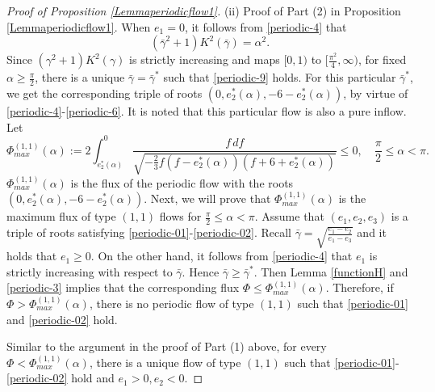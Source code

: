 \documentclass[reqno,12pt]{amsart}
\begin{document}
\begin{proof}[Proof of Proposition \ref{Lemmaperiodicflow1}]
     (ii) Proof of Part (2) in Proposition \ref{Lemmaperiodicflow1}.
    When $e_1 = 0$, it follows from \eqref{periodic-4} that 
\begin{equation}\label{periodic-9}
( \bar{\gamma}^2 + 1) K^2( \bar{\gamma}) = \alpha^2. 
\end{equation}
Since $( {\gamma}^2 +1)K^2( {\gamma})$ is strictly increasing and maps $[0, 1)$ to $[\frac{\pi^2}{4}, \infty)$, for fixed $\alpha\geq \frac{\pi}{2}$, there is a unique $ \bar{\gamma}=  \bar{\gamma}^*$ such that \eqref{periodic-9} holds. For this particular $ \bar{\gamma}^*$, we get the corresponding triple of roots $(0, e_2^*(\alpha), -6-e_2^*(\alpha))$, by virtue of \eqref{periodic-4}-\eqref{periodic-6}. It is noted that this particular flow is also a pure inflow. 
Let 
\begin{equation}\label{periodic-10}
    \Phi_{max}^{(1, 1)} (\alpha) := 2\int_{e_2^*(\alpha)}^0 \frac{f\, df}{\sqrt{-\frac23 f (f - e_2^*(\alpha))(f+ 6 + e_2^*(\alpha))}} \leq 0, 
    \quad
    \frac{\pi}{2}\leq \alpha<\pi. 
\end{equation}
$\Phi_{max}^{(1, 1)} (\alpha)$ is the flux of the periodic flow with the roots $(0, e_2^*(\alpha), -6- e^*_2(\alpha))$. Next, we will prove that $\Phi_{max}^{(1, 1)}(\alpha)$ is the maximum flux of type $(1, 1)$ flows for $\frac{\pi}{2}\leq \alpha<\pi$. 
Assume that $(e_1, e_2, e_3)$ is a triple of roots satisfying \eqref{periodic-01}-\eqref{periodic-02}. Recall 
    $\bar{\gamma} = \sqrt{\frac{e_1 - e_2}{e_1 - e_3}}$
and it holds that 
$ e_1 \geq 0$. On the other hand, 
it follows from \eqref{periodic-4} that $e_1$  is strictly increasing with respect to $ \bar{\gamma}$. Hence $ \bar{\gamma} \geq  \bar{\gamma}^*$.   Then Lemma \ref{functionH}  and  \eqref{periodic-3} implies that the corresponding flux $\Phi \leq \Phi_{max}^{(1,1)}(\alpha)$. Therefore, if $\Phi>\Phi^{(1,1)}_{max}(\alpha)$, there is no periodic flow of type $(1,1)$ such that \eqref{periodic-01} and \eqref{periodic-02} hold.

 Similar to the argument in the proof of Part (1) above, for every $\Phi < \Phi_{max}^{(1, 1)}(\alpha)$, there is a unique flow of type $(1, 1)$ such that \eqref{periodic-01}-\eqref{periodic-02} hold and $e_1>0, e_2<0$.


\end{proof}
\end{document}
